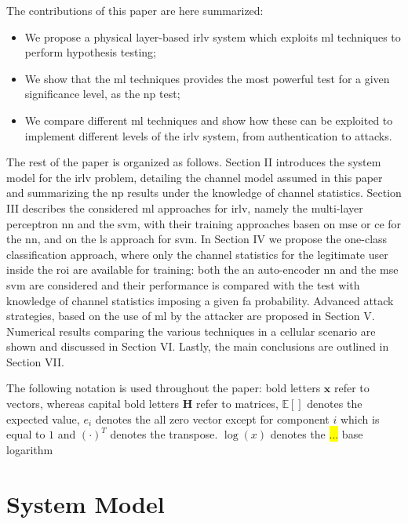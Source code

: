 \documentclass[draftcls,onecolumn,12pt]{IEEEtran}
\begin{document}
The contributions of this paper are here summarized:
\begin{itemize}
    \item We propose a  physical layer-based \ac{irlv} system which exploits \ac{ml} techniques to perform hypothesis testing;
    \item We show that the \ac{ml} techniques provides the most powerful test for a given significance level, as the \ac{np} test;
    \item We compare different \ac{ml} techniques and show how these can be exploited to implement different levels of the \ac{irlv} system, from authentication to attacks.
\end{itemize}

The rest of the paper is organized as follows. Section II introduces the system model for the \ac{irlv} problem, detailing the channel model assumed in this paper and summarizing the \ac{np} results under the knowledge of channel statistics. Section III describes the considered \ac{ml} approaches for \ac{irlv}, namely the multi-layer perceptron \ac{nn} and the \ac{svm}, with their training approaches basen on \ac{mse} or \ac{ce} for the \ac{nn}, and on the \ac{ls} approach for \ac{svm}. In Section IV we propose the one-class classification approach, where only the channel statistics for the legitimate user inside the \ac{roi} are available for training: both the an auto-encoder \ac{nn} and the \ac{mse} \ac{svm} are considered and their performance is compared with the test with knowledge of channel statistics imposing a given \ac{fa} probability. Advanced attack strategies, based on the use of \ac{ml} by the attacker are proposed in Section V. Numerical results comparing the various techniques in a cellular scenario are shown and discussed in Section VI. Lastly, the main conclusions are outlined in Section VII.

The following notation is used throughout the paper: bold letters $\bm{x}$ refer to vectors, whereas capital bold letters $\bm{H}$ refer to matrices, $\mathbb{E}[]$ denotes the expected value, $e_i$ denotes the all zero vector except for component $i$ which is equal to $1$ and $(\cdot)^T$ denotes the transpose. $\log(x)$ denotes the \colorbox{yellow}{...} base logarithm

\section{System Model}
\end{document}
